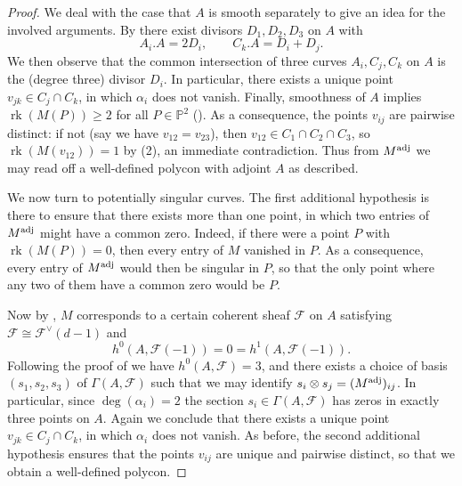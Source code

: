 \documentclass[a4paper,10pt]{amsart}
\theoremstyle{definition}
\theoremstyle{plain}
\newcommand{\rk}{\operatorname{rk}}
\newcommand{\cF}{{\mathcal F}}
\newcommand{\pp}{\mathbb{P}}
\begin{document}
\begin{proof}
 We deal with the case that $A$ is smooth separately to give an idea for the involved arguments. By  there exist divisors $D_1, D_2, D_3$ on $A$ with
 \begin{equation*}
    A_i.A = 2D_i, \qquad C_k.A = D_i + D_j.
 \end{equation*}
 We then observe that the common intersection of three curves $A_i, C_j, C_k$ on $A$ is the (degree three) divisor $D_i$. In particular, there exists a unique point $v_{jk} \in C_j \cap C_k$, in which $\alpha_i$ does not vanish. Finally, smoothness of $A$ implies $\rk(M(P)) \geq 2$ for all $P \in \pp^2$ (\cite[p.~885]{Vinnikov1984CubicDetRep}). As a consequence, the points $v_{ij}$ are pairwise distinct: if not (say we have $v_{12} = v_{23}$), then $v_{12} \in C_1 \cap C_2 \cap C_3$, so $\rk(M(v_{12})) = 1$ by (2), an immediate contradiction. Thus from $M^{\textup{adj}}$ we may read off a well-defined polycon with adjoint $A$ as described.

 We now turn to potentially singular curves. The first additional hypothesis is there to ensure that there exists more than one point, in which two entries of $M^{\textup{adj}}$ might have a common zero. Indeed, if there were a point $P$ with $\rk(M(P)) = 0$, then every entry of $M$ vanished in $P$. As a consequence, every entry of $M^{\textup{adj}}$ would then be singular in $P$, so that the only point where any two of them have a common zero would be $P$.
 
 Now by \cite[Proposition 5.4]{KernerVinnikov2012singularDetRep}, $M$ corresponds to a certain coherent sheaf $\cF$ on $A$ satisfying $\cF \cong \cF^\vee(d-1)$ and
 \begin{equation*}
     h^0(A, \cF(-1)) = 0 = h^1(A, \cF(-1)).
 \end{equation*}
 Following the proof of \cite[Theorem 4.3]{KernerVinnikov2012singularDetRep} we have $h^0(A, \cF) = 3$, and there exists a choice of basis $(s_1,s_2,s_3)$ of $\Gamma(A, \cF)$ such that we may identify $s_i \otimes s_j = (M^{\textup{adj}})_{ij}$. In particular, since $\deg(\alpha_i) = 2$ the section $s_i \in \Gamma(A,\cF)$ has zeros in exactly three points on $A$. Again we conclude that there exists a unique point $v_{jk} \in C_j \cap C_k$, in which $\alpha_i$ does not vanish. As before, the second additional hypothesis ensures that the points $v_{ij}$ are unique and pairwise distinct, so that we obtain a well-defined polycon.
\end{proof}
\end{document}
